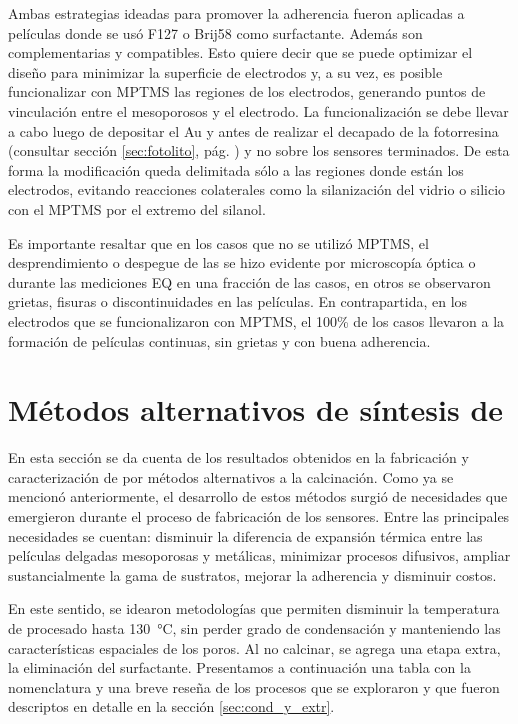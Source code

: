 			 Ambas estrategias ideadas para promover la adherencia fueron aplicadas a películas donde se usó F127 o Brij58 como surfactante. Además son complementarias y compatibles. Esto quiere decir que se puede optimizar el diseño para minimizar la superficie de electrodos y, a su vez, es posible funcionalizar con MPTMS las regiones de los electrodos, generando puntos de vinculación entre el mesoporosos y el electrodo. La funcionalización se debe llevar a cabo luego de depositar el Au y antes de realizar el decapado de la fotorresina (consultar sección \ref{sec:fotolito}, pág. \pageref{sec:fotolito}) y no sobre los sensores terminados. De esta forma la modificación queda delimitada sólo a las regiones donde están los electrodos, evitando reacciones colaterales como la silanización del vidrio o silicio con el MPTMS por el extremo del silanol.

			 Es importante resaltar que en los casos que no se utilizó MPTMS, el desprendimiento o despegue de las \pdm\space se hizo evidente por microscopía óptica o durante las mediciones EQ en una fracción de las casos, en otros se observaron grietas, fisuras o discontinuidades en las películas. En contrapartida, en los electrodos que se funcionalizaron con MPTMS, el 100\% de los casos llevaron a la formación de películas continuas, sin grietas y con buena adherencia.

\section{Métodos alternativos de síntesis de \pdm}
	
	 	 En esta sección se da cuenta de los resultados obtenidos en la fabricación y caracterización de \pdm\space por métodos alternativos a la calcinación. Como ya se mencionó anteriormente, el desarrollo de estos métodos surgió de necesidades que emergieron durante el proceso de fabricación de los sensores. Entre las principales necesidades se cuentan: disminuir la diferencia de expansión térmica entre las películas delgadas mesoporosas y metálicas, minimizar procesos difusivos, ampliar sustancialmente la gama de sustratos, mejorar la adherencia y disminuir costos.

		 En este sentido, se idearon metodologías que permiten disminuir la temperatura de procesado hasta \SI{130}{\celsius}, sin perder grado de condensación y manteniendo las características espaciales de los poros. Al no calcinar, se agrega una etapa extra, la eliminación del surfactante. Presentamos a continuación una tabla con la nomenclatura y una breve reseña de los procesos que se exploraron y que fueron descriptos en detalle en la sección \ref{sec:cond_y_extr}.

